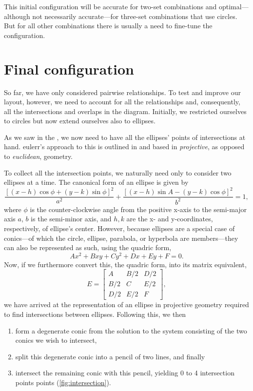 \documentclass[
  a4paper,
  nofonts,
  nobib,
  nohyper,
  openany
]{tufte-book}\usepackage[]{graphicx}\usepackage[]{color}
\newcommand{\pkg}[1]{{\fontseries{b}\selectfont #1}}
\begin{document}
This initial configuration will be accurate for two-set combinations and optimal---although not necessarily accurate---for three-set combinations that use circles. But for all other combinations there is usually a need to fine-tune the configuration.

\section{Final configuration}
\label{sec:finalConfig}

So far, we have only considered pairwise relationships. To test and improve our layout, however, we need to account for all the relationships and, consequently, all the intersections and overlaps in the diagram. Initially, we restricted ourselves to circles but now extend ourselves also to ellipses.

As we saw in the , we now need to have all the ellipses' points of intersections at hand. \pkg{eulerr}'s approach to this is outlined in \citet{richter-gebert_2011} and based in \emph{projective}, as opposed to \emph{euclidean}, geometry.

To collect all the intersection points, we naturally need only to consider two ellipses at a time. The canonical form of an ellipse is given by
\[
\frac{\left[ (x-h)\cos{\phi}+(y-k)\sin{\phi} \right]^2}{a^2}+\frac{\left[(x-h) \sin{A}-(y-k)
  \cos{\phi}\right]^2}{b^2} = 1,
\]
where $\phi$ is the counter-clockwise angle from the positive x-axis to the semi-major axis $a$, $b$ is the semi-minor axis, and $h, k$ are the x- and y-coordinates, respectively, of ellipse's center. However, because ellipses are a special case of conics---of which the circle, ellipse, parabola, or hyperbola are members---they can also be represented as such, using the quadric form,
\[
Ax^2 + Bxy + Cy^2 + Dx + Ey + F = 0.
\]
Now, if we furthermore convert this, the quadric form, into its matrix equivalent,
\[
E = \begin{bmatrix}
      A   & B/2 & D/2 \\
      B/2 & C   & E/2 \\
      D/2 & E/2 & F
    \end{bmatrix},
\]
we have arrived at the representation of an ellipse in projective geometry required to find intersections between ellipses. Following this, we then
\begin{enumerate}
\item form a degenerate conic from the solution to the system consisting of the two conics we wish to intersect,
\item split this degenerate conic into a pencil of two lines, and finally
\item intersect the remaining conic with this pencil, yielding 0 to 4 intersection points points (\cref{fig:intersection}).
\end{enumerate}
\end{document}
